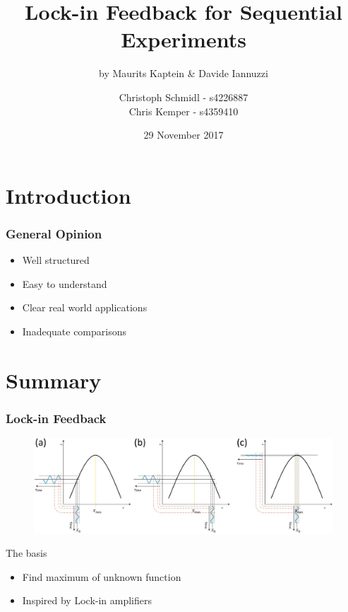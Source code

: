 \documentclass{beamer}
\title[Lock-in Feedback for Sequential Experiments]{
  Lock-in Feedback for Sequential Experiments}
\subtitle{by Maurits Kaptein \& Davide Iannuzzi}
\author[Schmidl \& Kemper]{
  Christoph Schmidl - s4226887 \\ Chris Kemper - s4359410\\}
\institute[Radboud University Nijmegen]{
  Master AI \\
  Radboud University Nijmegen}
\date[29 November 2017]{
  29 November 2017}
\begin{document}
\begin{frame}
  \titlepage
\end{frame}



\section{Introduction}

\begin{frame}
  \frametitle{General Opinion}
  \begin{itemize}
    \item Well structured
    \item Easy to understand
    \item Clear real world applications
    \item Inadequate comparisons
  \end{itemize}
\end{frame}

\section{Summary}

\begin{frame}
  \frametitle{Lock-in Feedback}
  
   
    \begin{figure}
            \centering
            \includegraphics[width=\textwidth]{images/General_Idea}
            \label{fig:alg}
        \end{figure}

  \begin{block}{The basis}
    \begin{itemize}
      \item Find maximum of unknown function
      \item Inspired by Lock-in amplifiers
    \end{itemize}
  \end{block}
\end{frame}
\end{document}
